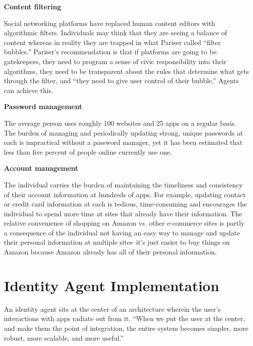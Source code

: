 \documentclass[11pt, oneside]{article}   	%
\begin{document}
\textbf{Content filtering}

Social networking platforms have replaced human content editors with algorithmic filters. Individuals may think that they are seeing a balance of content whereas in reality they are trapped in what Pariser called ``filter bubbles."\cite{Pariser2011} Pariser's recommendation is that if platforms are going to be gatekeepers, they need to program a sense of civic responsibility into their algorithms, they need to be transparent about the rules that determine what gets through the filter, and ``they need to give user control of their bubble.''\cite[p66]{McNamee2020} Agents can achieve this.

\textbf{Password management} 

The average person uses roughly 100 websites and 25 apps on a regular basis. The burden of managing and periodically updating strong, unique passwords at each is impractical without a password manager, yet it has been estimated that less than five percent of people online currently use one. 

\textbf{Account management} 

The individual carries the burden of maintaining the timeliness and consistency of their account information at hundreds of apps. For example, updating contact or credit card information at each is tedious, time-consuming and encourages the individual to spend more time at sites that already have their information. The relative convenience of shopping on Amazon vs. other e-commerce sites is partly a consequence of the individual not having an easy way to manage and update their personal information at multiple sites--it's just easier to buy things on Amazon because Amazon already has all of their personal information.


\section{Identity Agent Implementation} %

An identity agent sits at the center of an architecture wherein the user's interactions with apps radiate out from it. ``When we put the user at the center, and make them the point of integration, the entire system becomes simpler, more robust, more scalable, and more useful.''\cite{Andrieu2007}
\end{document}
